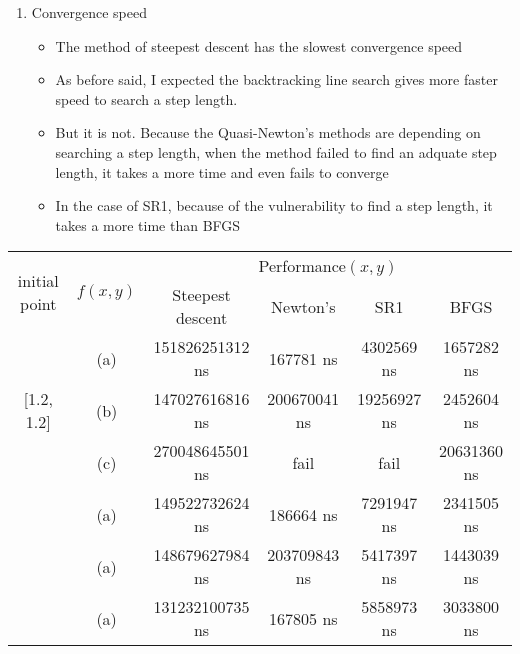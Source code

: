 \documentclass{standalone}
\begin{document}
\begin{enumerate}
  \item Convergence speed
  \begin{itemize}
    \item The method of steepest descent has the slowest convergence speed
    \item As before said, I expected the backtracking line search gives more faster speed to search a step length.
    \item But it is not. Because the Quasi-Newton's methods are depending on searching a step length, 
    when the method failed to find an adquate step length, it takes a more time and even fails to converge
    \item In the case of SR1, because of the vulnerability to find a step length, it takes a more time than BFGS
  \end{itemize}
\end{enumerate}
\begin{center}
  \begin{tabular}{| c | c | c | c | c | c | } \hline
  \multirow{2}{*}{initial point} & \multirow{2}{*}{$f(x, y)$}   & \multicolumn{4}{c|}{Performance$(x, y)$} \\ \cline{3-6}
                                  &                              & Steepest descent & Newton's     & SR1         & BFGS \\ \hline
  \multirow{3}{*}{[1.2, 1.2]}     & (a)                          & 151826251312 ns  & 167781 ns    & 4302569 ns  & 1657282 ns  \\ 
                                  & (b)                          & 147027616816 ns  & 200670041 ns & 19256927 ns & 2452604 ns  \\ 
                                  & (c)                          & 270048645501 ns  & fail         & fail        & 20631360 ns \\ \hline
  [5.6,-1.2]                      & (a)                          & 149522732624 ns  & 186664 ns    & 7291947 ns  & 2341505 ns \\ \hline
  [-3.5,2.3]                      & (a)                          & 148679627984 ns  & 203709843 ns & 5417397 ns  & 1443039 ns \\ \hline
  [10.5,-8.3]                     & (a)                          & 131232100735 ns  & 167805 ns    & 5858973 ns  & 3033800 ns \\ \hline
  \end{tabular}
\end{center}
\end{document}
